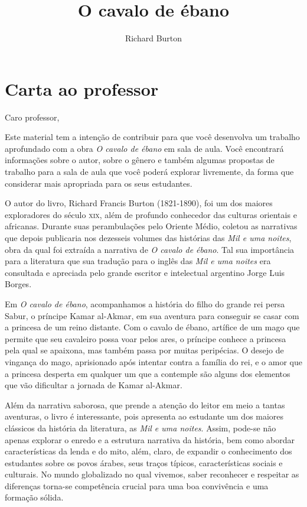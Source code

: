 \documentclass[11pt]{extarticle}
\newcommand{\AutorLivro}{Richard Burton}
\newcommand{\TituloLivro}{O cavalo de ébano}
\newcommand{\colaborador}{Paulo Pompermaier}
\begin{document}
\title{\TituloLivro}
\author{\AutorLivro}
\def\authornotes{\colaborador}

\date{}
\maketitle

\tableofcontents

\section{Carta ao professor}

Caro professor,

Este material tem a intenção de contribuir para que você desenvolva um trabalho aprofundado com a obra \textit{O cavalo de ébano} em sala de aula.
Você encontrará informações sobre o autor, sobre o gênero e também 
algumas propostas de trabalho para a sala de aula que você poderá explorar livremente, 
da forma que considerar mais apropriada para os seus estudantes.

O autor do livro, Richard Francis Burton (1821-1890), foi um dos maiores
exploradores do século \textsc{xix}, além de profundo conhecedor das culturas orientais e africanas. Durante suas perambulações pelo Oriente Médio, coletou as narrativas que depois publicaria nos dezesseis volumes das histórias das \textit{Mil e uma noites}, obra da qual foi extraída a narrativa de \textit{O cavalo de ébano}. Tal sua importância para a literatura que sua tradução para o inglês das \textit{Mil e uma noites} era consultada e apreciada pelo grande escritor e intelectual argentino Jorge Luis Borges.

Em \textit{O cavalo de ébano}, acompanhamos a história do filho do grande rei persa Sabur, o príncipe Kamar al-Akmar, em sua aventura para conseguir se casar com a princesa de um reino distante. Com o cavalo de ébano, artífice de um mago que permite que seu cavaleiro possa voar pelos ares, o príncipe conhece a princesa pela qual se apaixona, mas também passa por muitas peripécias. O desejo de vingança do mago, aprisionado após intentar contra a família do rei, e o amor que a princesa desperta em qualquer um que a contemple são alguns dos elementos que vão dificultar a jornada de Kamar al-Akmar.

Além da narrativa saborosa, que prende a atenção do leitor em meio a tantas aventuras, o livro é interessante, pois apresenta ao estudante um dos maiores clássicos da história da literatura, as \textit{Mil e uma noites}. Assim, pode-se não apenas explorar o enredo e a estrutura narrativa da história, bem como abordar características da lenda e do mito, além, claro, de expandir o conhecimento dos estudantes sobre os povos árabes, seus traços típicos, características sociais e culturais. No mundo globalizado no qual vivemos, saber reconhecer e respeitar as diferenças torna-se competência crucial para uma boa convivência e uma formação sólida.
\end{document}

